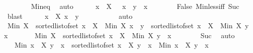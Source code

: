 \begin{isabellebody}
\ \ \ \ \ \ \isamarkupfalse%
\ Min{\isacharunderscore}{\kern0pt}eq\ \isamarkupfalse%
\ auto\isanewline
\ \ \ \ \isamarkupfalse%
\ {\isachardoublequoteopen}x\ {\isasymin}\ X\ {\isasymLongrightarrow}\ {\isasymnot}\ x\ {\isacharless}{\kern0pt}\ y{\isachardoublequoteclose}\ \ x\isanewline
\ \ \ \ \ \ \isamarkupfalse%
\ False\ Min{\isacharunderscore}{\kern0pt}less{\isacharunderscore}{\kern0pt}iff\ Suc{\isacharparenleft}{\kern0pt}{}{\isacharparenright}{\kern0pt}\ \isamarkupfalse%
\ blast\isanewline
\ \ \ \ \isamarkupfalse%
\ {\isachardoublequoteopen}{\isacharbraceleft}{\kern0pt}x\ {\isasymin}\ X{\isachardot}{\kern0pt}\ x\ {\isacharless}{\kern0pt}\ y{\isacharbraceright}{\kern0pt}\ {\isacharequal}{\kern0pt}\ {\isacharbraceleft}{\kern0pt}{\isacharbraceright}{\kern0pt}{\isachardoublequoteclose}\ \isanewline
\ \ \ \ \ \ \isamarkupfalse%
\ auto\isanewline
\ \ \ \ \isamarkupfalse%
\ {\isachardoublequoteopen}Min\ X\ {\isacharhash}{\kern0pt}\ sorted{\isacharunderscore}{\kern0pt}list{\isacharunderscore}{\kern0pt}of{\isacharunderscore}{\kern0pt}set\ {\isacharbraceleft}{\kern0pt}x\ {\isasymin}\ X\ {\isacharminus}{\kern0pt}\ {\isacharbraceleft}{\kern0pt}Min\ X{\isacharbraceright}{\kern0pt}{\isachardot}{\kern0pt}\ x\ {\isacharless}{\kern0pt}\ y{\isacharbraceright}{\kern0pt}\ {\isacharat}{\kern0pt}\ sorted{\isacharunderscore}{\kern0pt}list{\isacharunderscore}{\kern0pt}of{\isacharunderscore}{\kern0pt}set\ {\isacharbraceleft}{\kern0pt}x\ {\isasymin}\ X\ {\isacharminus}{\kern0pt}\ {\isacharbraceleft}{\kern0pt}Min\ X{\isacharbraceright}{\kern0pt}{\isachardot}{\kern0pt}\ y\ {\isasymle}\ x{\isacharbraceright}{\kern0pt}\ {\isacharequal}{\kern0pt}\isanewline
\ \ \ \ \ \ Min\ X\ {\isacharhash}{\kern0pt}\ sorted{\isacharunderscore}{\kern0pt}list{\isacharunderscore}{\kern0pt}of{\isacharunderscore}{\kern0pt}set\ {\isacharbraceleft}{\kern0pt}x\ {\isasymin}\ X\ {\isacharminus}{\kern0pt}\ {\isacharbraceleft}{\kern0pt}Min\ X{\isacharbraceright}{\kern0pt}{\isachardot}{\kern0pt}\ y\ {\isasymle}\ x{\isacharbraceright}{\kern0pt}{\isachardoublequoteclose}\isanewline
\ \ \ \ \ \ \isamarkupfalse%
\ Suc\ \isamarkupfalse%
\ auto\isanewline
\ \ \ \ \isamarkupfalse%
\ \isamarkupfalse%
\ {\isachardoublequoteopen}{\isasymdots}\ {\isacharequal}{\kern0pt}\ Min\ {\isacharbraceleft}{\kern0pt}x\ {\isasymin}\ X{\isachardot}{\kern0pt}\ y\ {\isasymle}\ x{\isacharbraceright}{\kern0pt}\ {\isacharhash}{\kern0pt}\ sorted{\isacharunderscore}{\kern0pt}list{\isacharunderscore}{\kern0pt}of{\isacharunderscore}{\kern0pt}set\ {\isacharparenleft}{\kern0pt}{\isacharbraceleft}{\kern0pt}x\ {\isasymin}\ X{\isachardot}{\kern0pt}\ y\ {\isasymle}\ x{\isacharbraceright}{\kern0pt}\ {\isacharminus}{\kern0pt}\ {\isacharbraceleft}{\kern0pt}Min\ {\isacharbraceleft}{\kern0pt}x\ {\isasymin}\ X{\isachardot}{\kern0pt}\ y\ {\isasymle}\ x{\isacharbraceright}{\kern0pt}{\isacharbraceright}{\kern0pt}{\isacharparenright}{\kern0pt}{\isachardoublequoteclose}\isanewline

\end{isabellebody}
